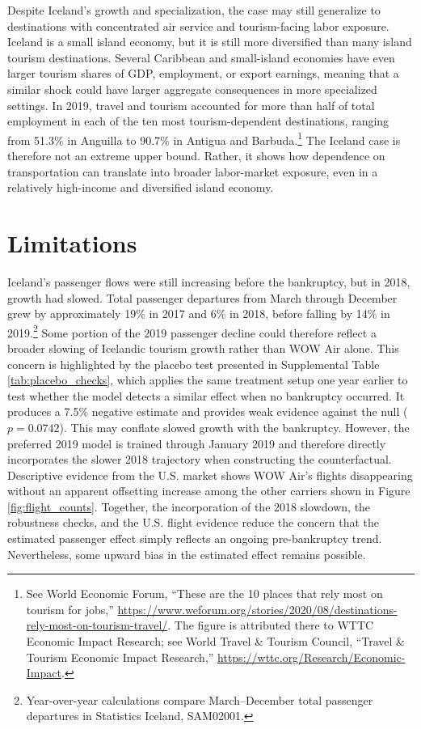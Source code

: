 \documentclass[12pt]{article}
\begin{document}
Despite Iceland's growth and specialization, the case may still generalize to destinations with concentrated air service and tourism-facing labor exposure. Iceland is a small island economy, but it is still more diversified than many island tourism destinations. Several Caribbean and small-island economies have even larger tourism shares of GDP, employment, or export earnings, meaning that a similar shock could have larger aggregate consequences in more specialized settings. In 2019, travel and tourism accounted for more than half of total employment in each of the ten most tourism-dependent destinations, ranging from 51.3\% in Anguilla to 90.7\% in Antigua and Barbuda.\footnote{See World Economic Forum, ``These are the 10 places that rely most on tourism for jobs,'' \url{https://www.weforum.org/stories/2020/08/destinations-rely-most-on-tourism-travel/}. The figure is attributed there to WTTC Economic Impact Research; see World Travel \& Tourism Council, ``Travel \& Tourism Economic Impact Research,'' \url{https://wttc.org/Research/Economic-Impact}.} The Iceland case is therefore not an extreme upper bound. Rather, it shows how dependence on transportation can translate into broader labor-market exposure, even in a relatively high-income and diversified island economy.




\clearpage
\section{Limitations}\label{sec:limitations}

Iceland's passenger flows were still increasing before the bankruptcy, but in 2018, growth had slowed. Total passenger departures from March through December grew by approximately 19\% in 2017 and 6\% in 2018, before falling by 14\% in 2019.\footnote{Year-over-year calculations compare March--December total passenger departures in Statistics Iceland, SAM02001.} Some portion of the 2019 passenger decline could therefore reflect a broader slowing of Icelandic tourism growth rather than WOW Air alone. This concern is highlighted by the placebo test presented in Supplemental Table \ref{tab:placebo_checks}, which applies the same treatment setup one year earlier to test whether the model detects a similar effect when no bankruptcy occurred. It produces a 7.5\% negative estimate and provides weak evidence against the null ($p=0.0742$). This may conflate slowed growth with the bankruptcy. However, the preferred 2019 model is trained through January 2019 and therefore directly incorporates the slower 2018 trajectory when constructing the counterfactual. Descriptive evidence from the U.S. market shows WOW Air's flights disappearing without an apparent offsetting increase among the other carriers shown in Figure \ref{fig:flight_counts}. Together, the incorporation of the 2018 slowdown, the robustness checks, and the U.S. flight evidence reduce the concern that the estimated passenger effect simply reflects an ongoing pre-bankruptcy trend. Nevertheless, some upward bias in the estimated effect remains possible.
\end{document}

